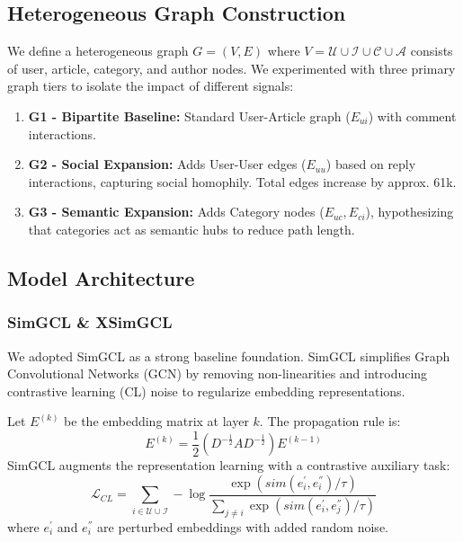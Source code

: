 \documentclass[11pt]{article}
\begin{document}
\subsection{Heterogeneous Graph Construction}
We define a heterogeneous graph $G = (V, E)$ where $V = \mathcal{U} \cup \mathcal{I} \cup \mathcal{C} \cup \mathcal{A}$ consists of user, article, category, and author nodes.
We experimented with three primary graph tiers to isolate the impact of different signals:
\begin{enumerate}
  \item \textbf{G1 - Bipartite Baseline:} Standard User-Article graph ($E_{ui}$) with comment interactions.
  \item \textbf{G2 - Social Expansion:} Adds User-User edges ($E_{uu}$) based on reply interactions, capturing social homophily. Total edges increase by approx. 61k.
  \item \textbf{G3 - Semantic Expansion:} Adds Category nodes ($E_{uc}, E_{ci}$), hypothesizing that categories act as semantic hubs to reduce path length.
\end{enumerate}

\subsection{Model Architecture}

\subsubsection{SimGCL \& XSimGCL}
We adopted SimGCL \citet{yu2022graph} as a strong baseline foundation. SimGCL simplifies Graph Convolutional Networks (GCN) by removing non-linearities and introducing contrastive learning (CL) noise to regularize embedding representations.

Let $E^{(k)}$ be the embedding matrix at layer $k$. The propagation rule is:
\begin{equation}
  E^{(k)} = \frac{1}{2} (D^{-\frac{1}{2}} A D^{-\frac{1}{2}}) E^{(k-1)}
\end{equation}
SimGCL augments the representation learning with a contrastive auxiliary task:
\begin{equation}
  \mathcal{L}_{CL} = \sum_{i \in \mathcal{U} \cup \mathcal{I}} - \log \frac{\exp(sim(e_i^{'}, e_i^{''}) / \tau)}{\sum_{j \neq i} \exp(sim(e_i^{'}, e_j^{''}) / \tau)}
\end{equation}
where $e_i^{'}$ and $e_i^{''}$ are perturbed embeddings with added random noise.
\end{document}

